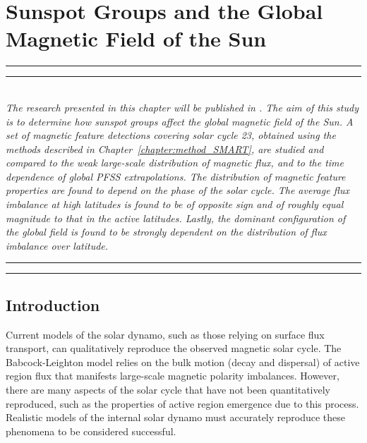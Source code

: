 
\chapter{Sunspot Groups and the Global Magnetic Field of the Sun} %
\label{chapter:results_global}

\graphicspath{{X/figures/EPS/}{6/figures/}}

\glsresetall


\hrule height 1mm
\vspace{0.5mm}
\hrule height 0.4mm 
\noindent 
\\ {\it 
The research presented in this chapter will be published in \emph{}. The aim of this study is to determine how sunspot groups affect the global magnetic field of the Sun. A set of magnetic feature detections covering solar cycle 23, obtained using the methods described in Chapter~\ref{chapter:method_SMART}, are studied and compared to the weak large-scale distribution of magnetic flux, and to the time dependence of global \gls{PFSS} extrapolations. The distribution of magnetic feature properties are found to depend on the phase of the solar cycle. The average flux imbalance at high latitudes is found to be of opposite sign and of roughly equal magnitude to that in the active latitudes. Lastly, the dominant configuration of the global field is found to be strongly dependent on the distribution of flux imbalance over latitude.  
}
\\ 
\hrule height 0.4mm
\vspace{0.5mm}
\hrule height 1mm 
\vspace{1.5cm}

\section{Introduction}

Current models of the solar dynamo, such as those relying on surface flux transport, can qualitatively reproduce the observed magnetic solar cycle. The Babcock-Leighton model relies on the bulk motion (decay and dispersal) of active region flux that manifests large-scale magnetic polarity imbalances. However, there are many aspects of the solar cycle that have not been quantitatively reproduced, such as the properties of active region emergence due to this process. Realistic models of the internal solar dynamo must accurately reproduce these phenomena to be considered successful.

